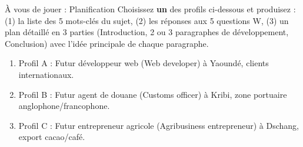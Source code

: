\documentclass[11pt]{article}
\begin{document}
\begin{exercice}{À vous de jouer : Planification}
Choisissez \textbf{un} des profils ci-dessous et produisez : (1) la liste des 5 mots-clés du sujet, (2) les réponses aux 5 questions W, (3) un plan détaillé en 3 parties (Introduction, 2 ou 3 paragraphes de développement, Conclusion) avec l'idée principale de chaque paragraphe.
\begin{enumerate}
    \item Profil A : Futur développeur web (Web developer) à Yaoundé, clients internationaux.
    \item Profil B : Futur agent de douane (Customs officer) à Kribi, zone portuaire anglophone/francophone.
    \item Profil C : Futur entrepreneur agricole (Agribusiness entrepreneur) à Dschang, export cacao/café.
\end{enumerate}
\end{exercice}
\end{document}
